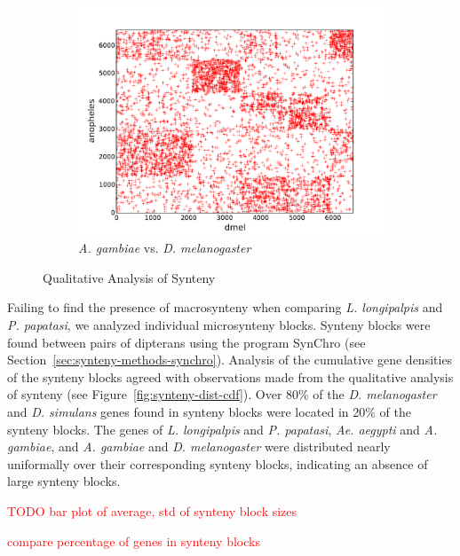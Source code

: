 \begin{figure}[H]
\begin{subfigure}[b]{0.45\textwidth}
    \label{fig:synteny-dotplots-drosophila}
  \end{subfigure}
  ~
  \begin{subfigure}[b]{0.45\textwidth}
    \includegraphics[width=\textwidth]{figures/synteny/dmel_anopheles_plot}
    \caption{\emph{A. gambiae} vs. \emph{D. melanogaster}}
    \label{fig:synteny-dotplots-anopheles-drosophila}
  \end{subfigure}
\label{fig:dot-plots}
\caption{Qualitative Analysis of Synteny}
\end{figure}

Failing to find the presence of macrosynteny when comparing \emph{L. longipalpis} and \emph{P. papatasi}, we analyzed individual microsynteny blocks. Synteny blocks were found between pairs of dipterans using the program SynChro (see Section~\ref{sec:synteny-methods-synchro}). Analysis of the cumulative gene densities of the synteny blocks agreed with observations made from the qualitative analysis of synteny (see Figure~\ref{fig:synteny-dist-cdf}).  Over 80\% of the \emph{D. melanogaster} and \emph{D. simulans} genes found in synteny blocks were located in 20\% of the synteny blocks.  The genes of \emph{L. longipalpis} and \emph{P. papatasi}, \emph{Ae. aegypti} and \emph{A. gambiae}, and \emph{A. gambiae} and \emph{D. melanogaster} were distributed nearly uniformally over their corresponding synteny blocks, indicating an absence of large synteny blocks.

\textcolor{red}{TODO bar plot of average, std of synteny block sizes}

\textcolor{red}{compare percentage of genes in synteny blocks}

